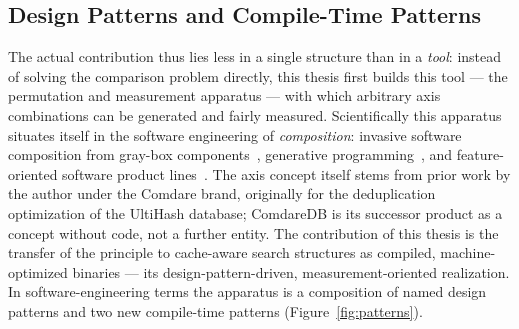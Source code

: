 \begin{nurlang}
\subsection{Design Patterns and Compile-Time Patterns}\label{sec:anatomy-patterns}
The actual contribution thus lies less in a single structure than in a \emph{tool}:
instead of solving the comparison problem directly, this thesis first builds this tool --- the
permutation and measurement apparatus --- with which arbitrary axis combinations can be generated and fairly
measured. Scientifically this apparatus situates itself in the software engineering of
\emph{composition}: invasive software composition from gray-box components~\cite{assmann2003invasive},
generative programming~\cite{czarnecki2000generative}, and feature-oriented
software product lines~\cite{apel2013feature,batory1992hierarchical}. The axis concept itself stems from
prior work by the author under the Comdare brand, originally for the deduplication optimization of the
UltiHash database; ComdareDB is its successor product as a concept without code, not a further entity.
The contribution of this thesis is the transfer of the principle to cache-aware search structures as
compiled, machine-optimized binaries --- its design-pattern-driven, measurement-oriented
realization. In software-engineering terms the
apparatus is a composition of named design patterns and two new compile-time patterns
(Figure~\ref{fig:patterns}).
\begin{figure}[htbp]\centering
{}
\end{figure}
\end{nurlang}
